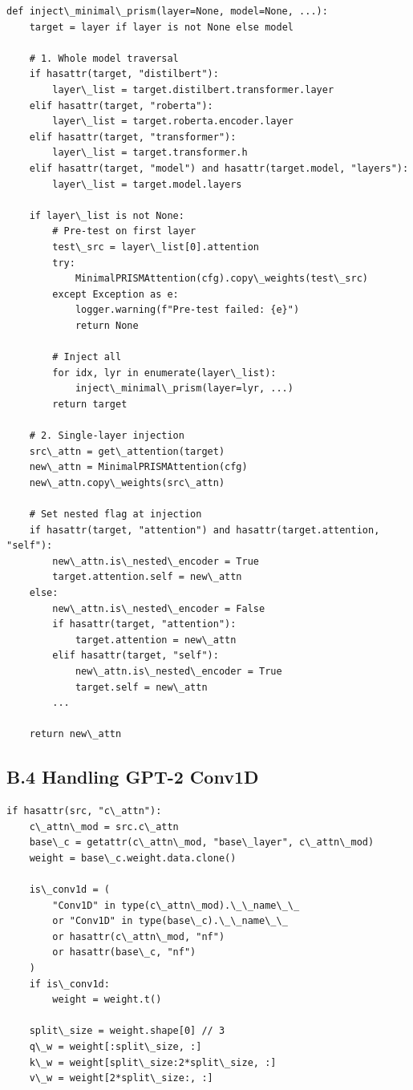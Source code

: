 \begin{lstlisting}
def inject\_minimal\_prism(layer=None, model=None, ...):
    target = layer if layer is not None else model
    
    # 1. Whole model traversal
    if hasattr(target, "distilbert"):
        layer\_list = target.distilbert.transformer.layer
    elif hasattr(target, "roberta"):
        layer\_list = target.roberta.encoder.layer
    elif hasattr(target, "transformer"):
        layer\_list = target.transformer.h
    elif hasattr(target, "model") and hasattr(target.model, "layers"):
        layer\_list = target.model.layers
    
    if layer\_list is not None:
        # Pre-test on first layer
        test\_src = layer\_list[0].attention
        try:
            MinimalPRISMAttention(cfg).copy\_weights(test\_src)
        except Exception as e:
            logger.warning(f"Pre-test failed: {e}")
            return None
        
        # Inject all
        for idx, lyr in enumerate(layer\_list):
            inject\_minimal\_prism(layer=lyr, ...)
        return target
    
    # 2. Single-layer injection
    src\_attn = get\_attention(target)
    new\_attn = MinimalPRISMAttention(cfg)
    new\_attn.copy\_weights(src\_attn)
    
    # Set nested flag at injection
    if hasattr(target, "attention") and hasattr(target.attention, "self"):
        new\_attn.is\_nested\_encoder = True
        target.attention.self = new\_attn
    else:
        new\_attn.is\_nested\_encoder = False
        if hasattr(target, "attention"):
            target.attention = new\_attn
        elif hasattr(target, "self"):
            new\_attn.is\_nested\_encoder = True
            target.self = new\_attn
        ...
    
    return new\_attn
\end{lstlisting}

\subsection{B.4 Handling GPT-2 Conv1D}

\begin{lstlisting}
if hasattr(src, "c\_attn"):
    c\_attn\_mod = src.c\_attn
    base\_c = getattr(c\_attn\_mod, "base\_layer", c\_attn\_mod)
    weight = base\_c.weight.data.clone()
    
    is\_conv1d = (
        "Conv1D" in type(c\_attn\_mod).\_\_name\_\_
        or "Conv1D" in type(base\_c).\_\_name\_\_
        or hasattr(c\_attn\_mod, "nf")
        or hasattr(base\_c, "nf")
    )
    if is\_conv1d:
        weight = weight.t()
    
    split\_size = weight.shape[0] // 3
    q\_w = weight[:split\_size, :]
    k\_w = weight[split\_size:2*split\_size, :]
    v\_w = weight[2*split\_size:, :]
\end{lstlisting}

